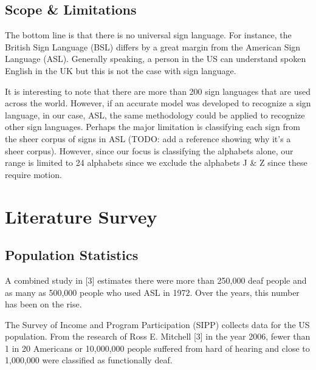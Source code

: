 \documentclass[12pt]{article}
\begin{document}
\subsection{Scope \& Limitations}
The bottom line is that there is no universal sign language. For instance, the 
British Sign Language (BSL) differs by a great margin from the American Sign 
Language (ASL). Generally speaking, a person in the US can understand spoken 
English in the UK but this is not the case with sign language.

It is interesting to note that there are more than 200 sign languages that are 
used across the world. However, if an accurate model was developed to 
recognize a sign language, in our case, ASL, the same methodology could be 
applied to recognize other sign languages. Perhaps the major limitation is 
classifying each sign from the sheer corpus of signs in ASL (TODO: add a 
reference showing why it’s a sheer corpus). However, since our focus is 
classifying the alphabets alone, our range is limited to 24 alphabets since we 
exclude the alphabets J \& Z since these require motion.

\section{Literature Survey}

\subsection{Population Statistics}
A combined study in [3] estimates there were more than 250,000 deaf people and 
as many as 500,000 people who used ASL in 1972. Over the years, this number 
has been on the rise.

The Survey of Income and Program Participation (SIPP) collects data for the US 
population. From the research of Ross E. Mitchell [3] in the year 2006, fewer 
than 1 in 20 Americans or 10,000,000 people suffered from hard of hearing and 
close to 1,000,000 were classified as functionally deaf.
\end{document}
